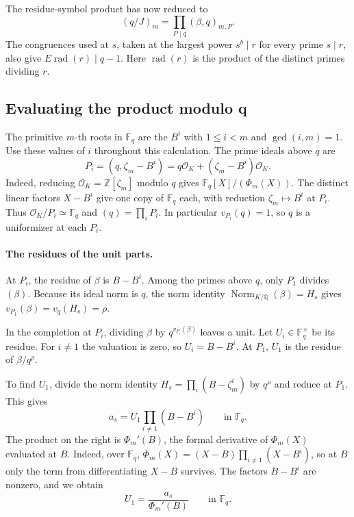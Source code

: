 \documentclass[11pt]{article}
\begin{document}
The residue-symbol product has now reduced to
\[
(q/J)_m=\prod_{P\mid q}(\beta,q)_{m,P}.
\]
The congruences used at $s$, taken at the largest power $s^b\mid r$
for every prime $s\mid r$, also give $E\operatorname{rad}(r)\mid q-1$.
Here $\operatorname{rad}(r)$ is the product of the distinct primes
dividing $r$.

\subsection{Evaluating the product modulo q}

The primitive $m$-th roots in $\mathbb F_q$ are the $B^i$ with
$1\le i<m$ and $\gcd(i,m)=1$. Use these values of $i$ throughout
this calculation. The prime ideals above $q$ are
\[
P_i=(q,\zeta_m-B^i)
    =q\mathcal O_K+(\zeta_m-B^i)\mathcal O_K.
\]
Indeed, reducing $\mathcal O_K=\mathbb Z[\zeta_m]$ modulo $q$
gives $\mathbb F_q[X]/(\Phi_m(X))$. The distinct linear factors
$X-B^i$ give one copy of $\mathbb F_q$ each, with reduction
$\zeta_m\mapsto B^i$ at $P_i$. Thus $\mathcal O_K/P_i\simeq
\mathbb F_q$ and $(q)=\prod_i P_i$. In particular $v_{P_i}(q)=1$,
so $q$ is a uniformizer at each $P_i$.

\paragraph{The residues of the unit parts.}
At $P_i$, the residue of $\beta$ is $B-B^i$. Among the primes
above $q$, only $P_1$ divides $(\beta)$. Because its ideal norm
is $q$, the norm identity $\operatorname{Norm}_{K/\mathbb Q}(\beta)
=H_s$ gives $v_{P_1}(\beta)=v_q(H_s)=\rho$.

In the completion at $P_i$, dividing $\beta$ by
$q^{v_{P_i}(\beta)}$ leaves a unit. Let $U_i\in\mathbb F_q^\times$
be its residue. For $i\ne1$ the valuation is zero, so $U_i=B-B^i$.
At $P_1$, $U_1$ is the residue of $\beta/q^\rho$.

To find $U_1$, divide the norm identity $H_s=\prod_i(B-\zeta_m^i)$
by $q^\rho$ and reduce at $P_1$. This gives
\[
a_s=U_1\prod_{i\ne1}(B-B^i)\qquad\text{in }\mathbb F_q.
\]
The product on the right is $\Phi_m'(B)$, the formal derivative
of $\Phi_m(X)$ evaluated at $B$. Indeed, over $\mathbb F_q$,
$\Phi_m(X)=(X-B)\prod_{i\ne1}(X-B^i)$, so at $B$ only the term
from differentiating $X-B$ survives. The factors $B-B^i$ are
nonzero, and we obtain
\[
U_1=\frac{a_s}{\Phi_m'(B)}\qquad\text{in }\mathbb F_q.
\]
\end{document}
